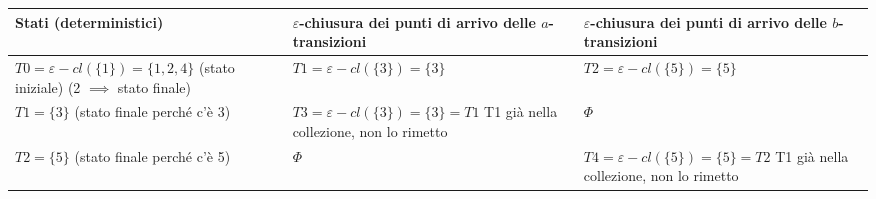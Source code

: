 \documentclass{standalone}
\providecommand\lightrule{%
	\arrayrulecolor{black!30}%
	\midrule[\lightrulewidth]%
	\arrayrulecolor{black}}
\begin{document}
\begin{tabularx}{\textwidth}{XXX}
    Stati (deterministici) & \(\varepsilon\)-chiusura dei punti di arrivo delle \(a\)-transizioni & \(\varepsilon\)-chiusura dei punti di arrivo delle \(b\)-transizioni \\
    \midrule
        \(T0 = \varepsilon-cl(\{1\}) = \{1,2,4\}\) \newline
        (stato iniziale) \newline
        (2 \(\implies\) stato finale)
        &
        \(T1 = \varepsilon-cl(\{3\}) = \{3\} \) \newline
        [T1 unmarked]
        &
        \(T2 = \varepsilon-cl(\{5\}) = \{5\}\) \newline 
        [T2 unmarked]
        \\ \lightrule
        \(T1 = \{3\}\) \newline
        (stato finale perché c’è 3)
        &
        \(T3 = \varepsilon-cl(\{3\}) = \{3\} = T1\) \newline
        T1 già nella collezione, non lo rimetto
        &
        \(\Phi\)
        \\ \lightrule
        \(T2 = \{5\}\) \newline
        (stato finale perché c’è 5)
        &
        \(\Phi\)
        &
        \(T4 = \varepsilon-cl(\{5\}) = \{5\} = T2\)
        T1 già nella collezione, non lo rimetto
        \\
\end{tabularx}
\end{document}
